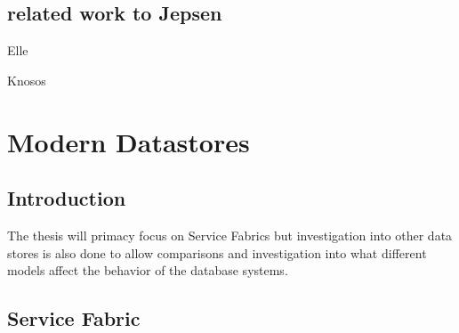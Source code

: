 \documentclass[a4paper,10pt,titlepage]{report}
\begin{document}
    \section{related work to Jepsen}
    
    Elle
    
    Knosos












    \newpage


    \chapter{Modern Datastores}


    \section{Introduction}

    The thesis will primacy focus on Service Fabrics but investigation into other data stores is also done to allow comparisons and investigation into what different models affect the behavior of the database systems.


    \section{Service Fabric}

%
\end{document}
